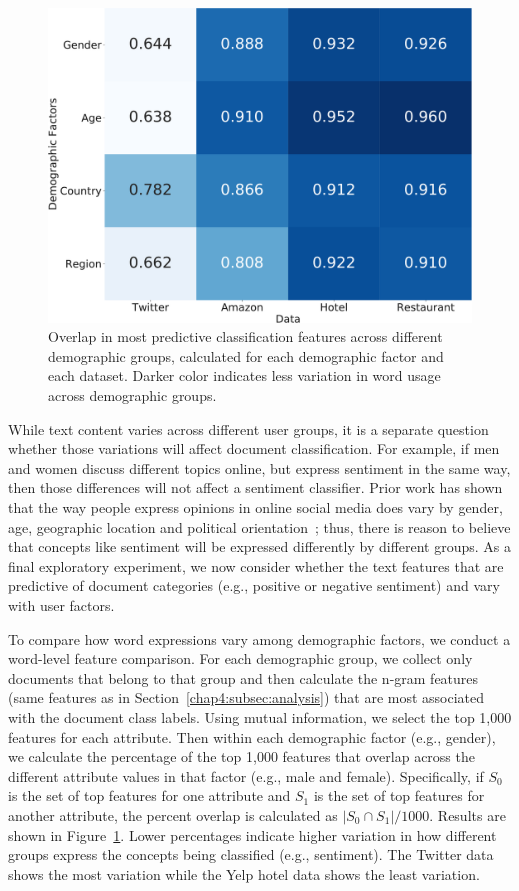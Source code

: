 \begin{figure}[t!]
\centering
\includegraphics[scale=0.35]{./images/chapter4/overlap.pdf}
\caption{Overlap in most predictive classification features across different demographic groups, calculated for each demographic factor and each dataset. Darker color indicates less variation in word usage across demographic groups.
}
\label{chap4:fig:overlap}
\end{figure}

While text content varies across different user groups,
it is a separate question whether those variations will affect document classification.
For example, if men and women discuss different topics online,
but express sentiment in the same way,
then those differences will not affect a sentiment classifier.
Prior work has shown that the way 
people express opinions in online social media 
does vary by gender, age, geographic location and political orientation~\cite{hinds2018demographic};
thus, there is reason to believe that concepts like sentiment will be expressed differently by different groups.
As a final exploratory experiment,
we now consider whether the text features that are predictive of
document categories (e.g., positive or negative sentiment)
and vary with user factors.


To compare how word expressions vary among demographic factors, we conduct a word-level feature comparison.
For each demographic group, we collect only documents that belong to that group and then calculate the n-gram features (same features as in Section~\ref{chap4:subsec:analysis}) that are most associated with the document class labels.
Using mutual information, we select the top 1,000 features for each attribute.
Then within each demographic factor (e.g., gender),
we calculate the percentage of the top 1,000 features that overlap across the different attribute values in that factor (e.g., male and female).
Specifically, if $S_0$ is the set of top features for one attribute and $S_1$ is the set of top features for another attribute, the percent overlap is calculated as $|S_0 \cap S_1|/1000$.
Results are shown in Figure~\ref{chap4:fig:overlap}. 
Lower percentages indicate higher variation in how different groups express the concepts being classified (e.g., sentiment).
The Twitter data shows the most variation while the Yelp hotel data shows the least variation.


